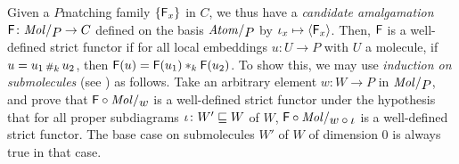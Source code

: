 \begin{comm} \label{comm:well_defined_amalgamation}
    Given a \( P \)\nbd matching family \( \left\{ {\mathsf{F}_x} \right\} \) in \( C \), we thus have a \emph{candidate amalgamation} \( \F \colon \molecin{P} \to C \) defined on the basis \( \atomin{P} \) by \( \iota_{x} \mapsto \langle\mathsf{F}_x\rangle \).
    Then, \( \mathsf{F} \) is a well-defined strict functor if for all local embeddings \( u \colon U \to P \) with \( U \) a molecule, if \( u = u_1 \,{\scriptstyle\#}_{k}\, u_2 \), then \( \mathsf{F}(u) = \mathsf{F}(u_1) *_{k} \mathsf{F}(u_2) \).
    To show this, we may use \emph{induction on submolecules} (see \cite[Comment 4.1.7]{hadzihasanovic2024combinatorics}) as follows.
    Take an arbitrary element \( w \colon W \to P \) in \( \molecin{P} \), and prove that \( \F \after \molecin{w} \) is a well-defined strict functor under the hypothesis that for all proper subdiagrams \( \iota \colon W' \sqsubseteq W \) of \( W \), \( \F \after \molecin{w \after \iota} \) is a well-defined strict functor.
    The base case on submolecules \( W' \) of \( W \) of dimension \( 0 \) is always true in that case. 
\end{comm}

